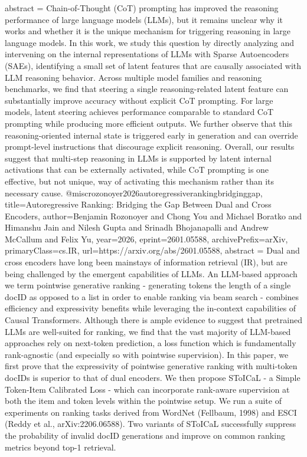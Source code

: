 {      abstract = {Chain-of-Thought (CoT) prompting has improved the reasoning performance of large language models (LLMs), but it remains unclear why it works and whether it is the unique mechanism for triggering reasoning in large language models. In this work, we study this question by directly analyzing and intervening on the internal representations of LLMs with Sparse Autoencoders (SAEs), identifying a small set of latent features that are causally associated with LLM reasoning behavior. Across multiple model families and reasoning benchmarks, we find that steering a single reasoning-related latent feature can substantially improve accuracy without explicit CoT prompting. For large models, latent steering achieves performance comparable to standard CoT prompting while producing more efficient outputs. We further observe that this reasoning-oriented internal state is triggered early in generation and can override prompt-level instructions that discourage explicit reasoning. Overall, our results suggest that multi-step reasoning in LLMs is supported by latent internal activations that can be externally activated, while CoT prompting is one effective, but not unique, way of activating this mechanism rather than its necessary cause.}
}@misc{rozonoyer2026autoregressiverankingbridginggap,
      title={Autoregressive Ranking: Bridging the Gap Between Dual and Cross Encoders}, 
      author={Benjamin Rozonoyer and Chong You and Michael Boratko and Himanshu Jain and Nilesh Gupta and Srinadh Bhojanapalli and Andrew McCallum and Felix Yu},
      year={2026},
      eprint={2601.05588},
      archivePrefix={arXiv},
      primaryClass={cs.IR},
      url={https://arxiv.org/abs/2601.05588},
      abstract = {Dual and cross encoders have long been mainstays of information retrieval (IR), but are being challenged by the emergent capabilities of LLMs. An LLM-based approach we term pointwise generative ranking - generating tokens the length of a single docID as opposed to a list in order to enable ranking via beam search - combines efficiency and expressivity benefits while leveraging the in-context capabilities of Causal Transformers. Although there is ample evidence to suggest that pretrained LLMs are well-suited for ranking, we find that the vast majority of LLM-based approaches rely on next-token prediction, a loss function which is fundamentally rank-agnostic (and especially so with pointwise supervision). In this paper, we first prove that the expressivity of pointwise generative ranking with multi-token docIDs is superior to that of dual encoders. We then propose SToICaL - a Simple Token-Item Calibrated Loss - which can incorporate rank-aware supervision at both the item and token levels within the pointwise setup. We run a suite of experiments on ranking tasks derived from WordNet (Fellbaum, 1998) and ESCI (Reddy et al., arXiv:2206.06588). Two variants of SToICaL successfully suppress the probability of invalid docID generations and improve on common ranking metrics beyond top-1 retrieval.}
}
